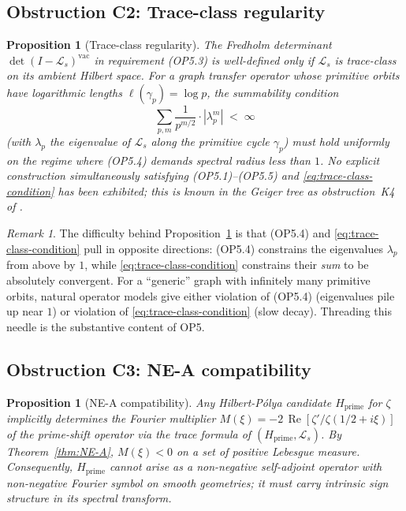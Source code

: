 \documentclass[11pt]{article}
\newtheorem{proposition}[theorem]{Proposition}
\theoremstyle{definition}
\theoremstyle{remark}
\newtheorem{remark}[theorem]{Remark}
\renewcommand{\Re}{\operatorname{Re}}
\begin{document}
\subsection{Obstruction C2: Trace-class regularity}
\label{sec:obs-C2}

\begin{proposition}[Trace-class regularity]\label{prop:trace-class}
The Fredholm determinant $\det(I - \mathcal{L}_s)^{\mathrm{vac}}$ in
requirement (OP5.3) is well-defined only if $\mathcal{L}_s$ is
trace-class on its ambient Hilbert space. For a graph transfer
operator whose primitive orbits have logarithmic lengths
$\ell(\gamma_p) = \log p$, the summability condition
\begin{equation}
\label{eq:trace-class-condition}
  \sum_{p,m} \frac{1}{p^{m/2}} \cdot |\lambda_p^m|
  \;<\; \infty
\end{equation}
(with $\lambda_p$ the eigenvalue of $\mathcal{L}_s$ along the primitive
cycle $\gamma_p$) must hold uniformly on the regime where (OP5.4)
demands spectral radius less than $1$. No explicit construction
simultaneously satisfying (OP5.1)--(OP5.5) and
\eqref{eq:trace-class-condition} has been exhibited; this is known in
the Geiger tree as obstruction~K4 of \cite{Geiger2026RHI}.
\end{proposition}

\begin{remark}\label{rem:trace-class-connection}
The difficulty behind Proposition~\ref{prop:trace-class} is that
(OP5.4) and \eqref{eq:trace-class-condition} pull in opposite
directions: (OP5.4) constrains the eigenvalues $\lambda_p$ from above
by $1$, while \eqref{eq:trace-class-condition} constrains their
\emph{sum} to be absolutely convergent. For a ``generic'' graph
with infinitely many primitive orbits, natural operator models give
either violation of (OP5.4) (eigenvalues pile up near $1$) or
violation of \eqref{eq:trace-class-condition} (slow decay). Threading
this needle is the substantive content of OP5.
\end{remark}

\subsection{Obstruction C3: NE-A compatibility}
\label{sec:obs-C3}

\begin{proposition}[NE-A compatibility]\label{prop:ne-a-compat}
Any Hilbert-P\'olya candidate $H_\mathrm{prime}$ for $\zeta$ implicitly
determines the Fourier multiplier
$M(\xi) = -2\,\Re[\zeta'/\zeta(1/2 + i\xi)]$ of the prime-shift
operator via the trace formula of $(H_\mathrm{prime}, \mathcal{L}_s)$.
By Theorem~\ref{thm:NE-A}, $M(\xi) < 0$ on a set of positive
Lebesgue measure. Consequently, $H_\mathrm{prime}$ cannot arise as
a non-negative self-adjoint operator with non-negative Fourier
symbol on smooth geometries; it must carry intrinsic sign structure
in its spectral transform.
\end{proposition}
\end{document}
